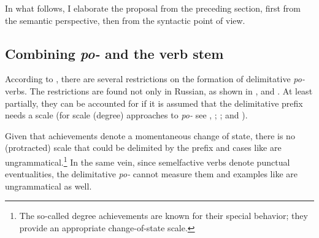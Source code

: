 \documentclass[output=paper,colorlinks,citecolor=brown]{langscibook}
\begin{document}
In what follows, I elaborate the proposal from the preceding section, first from the semantic perspective, then from the syntactic point of view.

\subsection{Combining \textit{po-} and the verb stem} \label{biskup:sec:combiningpo}

According to \citet[392]{Isačenko1962}, there are several restrictions on the formation of delimitative \textit{po-}verbs. The restrictions are found not %
only in Russian, as shown in ,  and . At least partially, they can be accounted for if it is assumed that the delimitative prefix needs a scale (for scale (degree) approaches to \textit{po-} see \citealt{bis:Filip2000}, \citeyear{Filip2003}; \citealt{Jablonska2004,Souckova2004b,Souckova2004a}; \citealt{Kagan2016} and \citealt{Zinova2021}). 

\z

\z

\z

\noindent Given that achievements denote a momentaneous change of state, there is no (protracted) scale that could be delimited by the prefix and cases like  are ungrammatical.\footnote{The so-called degree achievements are known for their special behavior; they provide an appropriate change-of-state scale.}  In the same vein, since semelfactive verbs denote punctual eventualities, the delimitative \textit{po-} cannot measure them and examples like  are ungrammatical as well.
\end{document}
